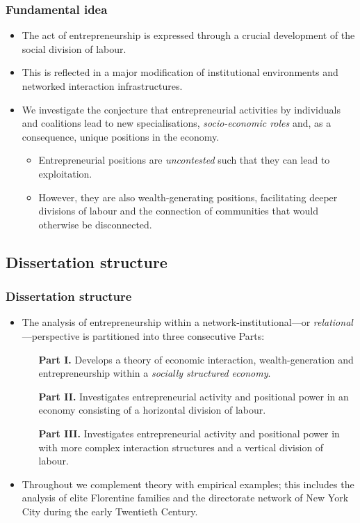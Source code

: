 \documentclass[10pt]{beamer}
\begin{document}
\begin{frame} \frametitle{Fundamental idea}
\begin{itemize}
\item The act of entrepreneurship is expressed through a crucial development of the social division of labour. 
\medskip
\item This is reflected in a major modification of institutional environments and networked interaction infrastructures.
\medskip
\item We investigate the conjecture that entrepreneurial activities by individuals and coalitions lead to new specialisations, \emph{socio-economic roles} and, as a consequence, unique positions in the economy.
\medskip
\begin{itemize}
\item Entrepreneurial positions are \emph{uncontested} such that they can lead to exploitation.
\medskip
\item However, they are also wealth-generating positions, facilitating deeper divisions of labour and the connection of communities that would otherwise be disconnected.
\end{itemize}
\end{itemize}
\end{frame}

\subsection{Dissertation structure}

\begin{frame} \frametitle{Dissertation structure}
\begin{itemize}
\item The analysis of entrepreneurship within a network-institutional---or \emph{relational}---perspective is partitioned into three consecutive Parts:
\medskip
\begin{itemize}
\item[\textbf{Part I.}] Develops a theory of economic interaction, wealth-generation and entrepreneurship within a \emph{socially structured economy}.
\medskip
\item[\textbf{Part II.}] Investigates entrepreneurial activity and positional power in an economy consisting of a horizontal division of labour.
\medskip
\item[\textbf{Part III.}] Investigates entrepreneurial activity and positional power in with more complex interaction structures and a vertical division of labour.
\end{itemize}
\medskip
\item Throughout we complement theory with empirical examples; this includes the analysis of elite Florentine families and the directorate network of New York City during the early Twentieth Century.
\end{itemize}
\end{frame}
\end{document}
